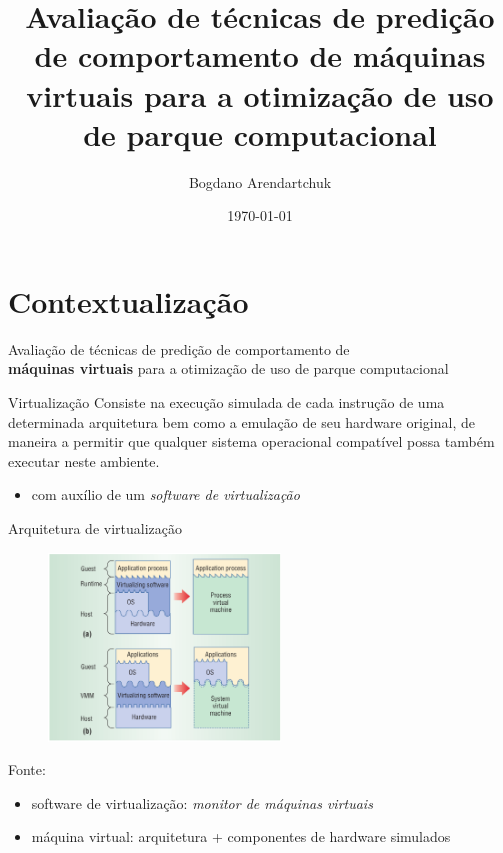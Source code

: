 \documentclass{beamer}
\institute{Universidade Tuiuti do Paraná}
\author{Bogdano Arendartchuk}
\title{Avaliação de técnicas de predição de comportamento de máquinas
virtuais para a otimização de uso de parque computacional}
\date{\today}
\begin{document}
\frame{\titlepage}

\section{Contextualização}

\begin{frame}{}
\begin{block}{}
\centering
Avaliação de técnicas de predição de comportamento de \\
\textbf{{\color{red}máquinas virtuais}}
para a otimização de uso de parque computacional
\end{block}
\end{frame}

\begin{frame}
\begin{block}{Virtualização}
Consiste na execução simulada de cada instrução de uma determinada
arquitetura bem como a emulação de seu hardware original, de maneira a
permitir que qualquer sistema operacional compatível possa também executar
neste ambiente.\cite{goldberg1974survey}
\end{block}
\begin{itemize}
\item com auxílio de um \emph{software de virtualização}
\end{itemize}
\end{frame}


\begin{frame}{Arquitetura de virtualização}
\begin{figure}
\centering
\includegraphics[height=5cm]{img/img-smith2005vir.png}
\end{figure}
\tiny{Fonte: \cite{smith2005architecture}}
\begin{itemize}
\item software de virtualização: \emph{monitor de máquinas virtuais}
\item máquina virtual: arquitetura + componentes de hardware simulados
\end{itemize}
\end{frame}
\end{document}
